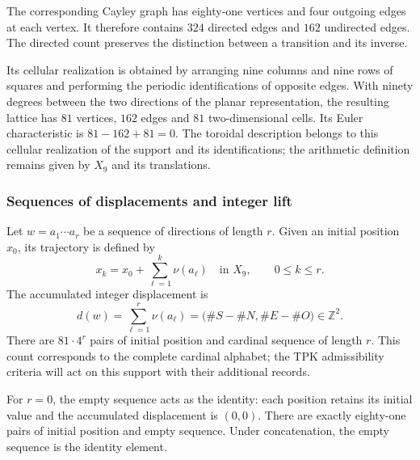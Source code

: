 The corresponding Cayley graph has eighty-one vertices and four outgoing edges at each vertex. It therefore contains $324$ directed edges and $162$ undirected edges. The directed count preserves the distinction between a transition and its inverse.

Its cellular realization is obtained by arranging nine columns and nine rows of squares and performing the periodic identifications of opposite edges. With ninety degrees between the two directions of the planar representation, the resulting lattice has $81$ vertices, $162$ edges and $81$ two-dimensional cells. Its Euler characteristic is $81-162+81=0$. The toroidal description belongs to this cellular realization of the support and its identifications; the arithmetic definition remains given by $X_9$ and its translations.

\subsubsection{Sequences of displacements and integer lift}

Let $w=a_1\cdots a_r$ be a sequence of directions of length $r$. Given an initial position $x_0$, its trajectory is defined by
\[
 x_k=x_0+\sum_{\ell=1}^{k}\nu(a_\ell)\quad\text{in }X_9,
 \qquad 0\leq k\leq r.
\]
The accumulated integer displacement is
\begin{equation}
 d(w)=\sum_{\ell=1}^{r}\nu(a_\ell)
      =\bigl(\#S-\#N,\#E-\#O\bigr)\in\mathbb Z^2.
 \label{eq:app-displacement}
\end{equation}
There are $81\cdot4^r$ pairs of initial position and cardinal sequence of length $r$. This count corresponds to the complete cardinal alphabet; the TPK admissibility criteria will act on this support with their additional records.

For $r=0$, the empty sequence acts as the identity: each position retains its initial value and the accumulated displacement is $(0,0)$. There are exactly eighty-one pairs of initial position and empty sequence. Under concatenation, the empty sequence is the identity element.


